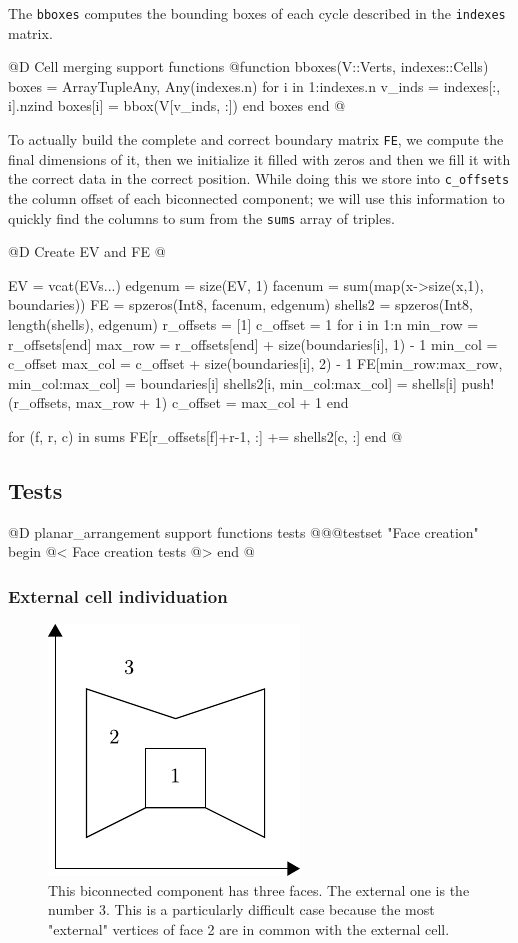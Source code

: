 The \texttt{bboxes} computes the bounding boxes of each cycle
described in the \texttt{indexes} matrix.

@D Cell merging support functions
@{function bboxes(V::Verts, indexes::Cells)
    boxes = Array{Tuple{Any, Any}}(indexes.n)
    for i in 1:indexes.n
        v_inds = indexes[:, i].nzind
        boxes[i] = bbox(V[v_inds, :])
    end
    boxes
end
@}

To actually build the complete and correct boundary matrix \texttt{FE},
we compute the final dimensions of it, then we initialize it filled with
zeros and then we fill it with the correct data in the correct position.
While doing this we store into \texttt{c\_offsets} the column offset of each
biconnected component; we will use this information to quickly find the columns 
to sum from the \texttt{sums} array of triples.

@D Create EV and FE
@{EV = vcat(EVs...)
edgenum = size(EV, 1)
facenum = sum(map(x->size(x,1), boundaries))
FE = spzeros(Int8, facenum, edgenum)
shells2 = spzeros(Int8, length(shells), edgenum)
r_offsets = [1]
c_offset = 1
for i in 1:n
    min_row = r_offsets[end]
    max_row = r_offsets[end] + size(boundaries[i], 1) - 1
    min_col = c_offset
    max_col = c_offset + size(boundaries[i], 2) - 1
    FE[min_row:max_row, min_col:max_col] = boundaries[i]
    shells2[i, min_col:max_col] = shells[i]
    push!(r_offsets, max_row + 1)
    c_offset = max_col + 1
end

for (f, r, c) in sums
    FE[r_offsets[f]+r-1, :] += shells2[c, :]
end
@}


\subsection{Tests}

@D planar\_arrangement support functions tests
@{@@testset "Face creation" begin
    @< Face creation tests @>
end
@}

\subsubsection{External cell individuation}
\begin{figure}[h]
    \centering
    \includegraphics{./img/ch2-externcell.pdf}
    \caption{This biconnected component has three faces. The external one is the number 3.
    This is a particularly difficult case because the most "external" vertices of face 2
    are in common with the external cell.}
\end{figure}

